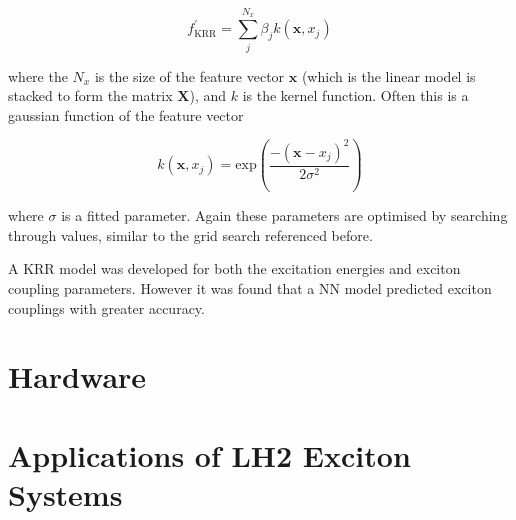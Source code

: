\begin{equation}
	f_{\text{KRR}}^\prime = \sum^{N_x}_j \beta_j k\left(\mathbf{x}, x_j\right)
\end{equation}

where the $N_x$ is the size of the feature vector $\mathbf{x}$ (which is the linear
model is stacked to form the matrix $\mathbf{X}$), and $k$ is the kernel function.
Often this is a gaussian function of the feature vector

\begin{equation}
	k\left(\mathbf{x}, x_j\right) = \text{exp}\left(\frac{-\left(\mathbf{x}-x_j\right)^2}{2\sigma^2}\right)
\end{equation}

where $\sigma$ is a fitted parameter. Again these parameters are optimised by searching
through values, similar to the grid search referenced before.

A KRR model was developed for both the excitation energies and exciton coupling 
parameters. However it was found that a NN model predicted exciton couplings with
greater accuracy.


\section{Hardware}
\label{sec:hardware}

\section{Applications of LH2 Exciton Systems}
\label{sec:lit_review_conclusions}
